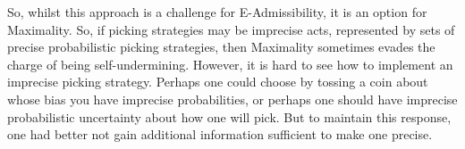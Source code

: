 \documentclass[a4paper]{article}
\newcommand{\todoold}[2][]{\todo[backgroundcolor=white,bordercolor=orange!10,linecolor=gray!10, #1,caption={},textcolor=gray]{Pre-rev: #2}}
\newcommand{\todooldinfo}[2][]{\todoold[#1]{#2}}
\newenvironment{CCM rewritten}
{\begingroup\color{blue}} %
{\endgroup}              %
\begin{document}
	So, whilst this approach is a challenge for E-Admissibility, it is an option for Maximality.  
	So, if picking strategies may be imprecise acts, represented by sets of precise probabilistic picking strategies, then Maximality sometimes evades the charge of being self-undermining. However, it is hard to see how to implement an imprecise picking strategy. Perhaps one could choose by tossing a coin about whose bias you have imprecise probabilities, or perhaps one should have imprecise probabilistic uncertainty about how one will pick. But to maintain this response, one had better not gain additional information sufficient to make one precise. 
	

	
	
	
\end{document}
